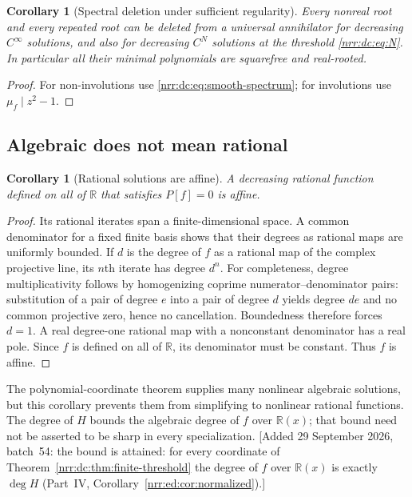 \documentclass[11pt,letterpaper]{article}
\newtheorem{corollary}[theorem]{Corollary}
\theoremstyle{definition}
\theoremstyle{remark}
\newcommand{\R}{\mathbb R}
\begin{document}
\begin{corollary}[Spectral deletion under sufficient regularity]
\label{nrr:dc:cor:deletion}
Every nonreal root and every repeated root can be deleted from a
universal annihilator for decreasing $C^\infty$ solutions, and also
for decreasing $C^N$ solutions at the threshold \eqref{nrr:dc:eq:N}.
In particular all their minimal polynomials are squarefree and real-rooted.
\end{corollary}
\begin{proof}
For non-involutions use \eqref{nrr:dc:eq:smooth-spectrum}; for involutions
use $\mu_f\mid z^2-1$.
\end{proof}

\subsection{Algebraic does not mean rational}

\begin{corollary}[Rational solutions are affine]
\label{nrr:dc:cor:rational}
A decreasing rational function defined on all of $\R$ that satisfies
$P[f]=0$ is affine.
\end{corollary}
\begin{proof}
Its rational iterates span a finite-dimensional space. A common
denominator for a fixed finite basis shows that their degrees as
rational maps are uniformly bounded. If $d$ is the degree of $f$
as a rational map of the complex projective line, its $n$th iterate
has degree $d^n$. For completeness, degree multiplicativity follows
by homogenizing coprime numerator--denominator pairs: substitution of
a pair of degree $e$ into a pair of degree $d$ yields degree $de$
and no common projective zero, hence no cancellation. Boundedness
therefore forces $d=1$.
A real degree-one rational map with a nonconstant denominator has a
real pole. Since $f$ is defined on all of $\R$, its denominator must
be constant. Thus $f$ is affine.
\end{proof}

The polynomial-coordinate theorem supplies many nonlinear algebraic
solutions, but this corollary prevents them from simplifying to
nonlinear rational functions. The degree of $H$ bounds the algebraic
degree of $f$ over $\R(x)$; that bound need not be asserted to be sharp
in every specialization.
[Added 29 September 2026, batch~54: the bound is attained: for every
coordinate of Theorem~\ref{nrr:dc:thm:finite-threshold} the degree of $f$ over
$\R(x)$ is exactly $\deg H$ (Part~IV, Corollary~\ref{nrr:ed:cor:normalized}).]
\end{document}
